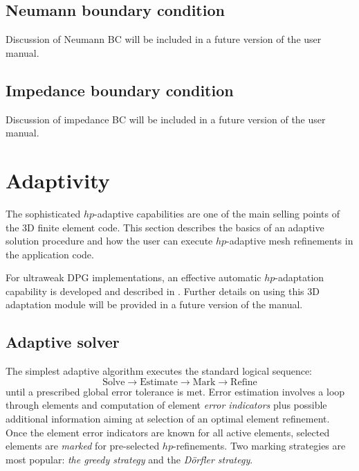 \subsection{Neumann boundary condition}
\label{sec:impedance}

Discussion of Neumann BC will be included in a future version of the user manual.

\subsection{Impedance boundary condition}
\label{sec:impedance}

Discussion of impedance BC will be included in a future version of the user manual.

\section{Adaptivity}
\label{sec:adaptivity}

The sophisticated $hp$-adaptive capabilities are one of the main selling points of the \hp3D finite element code. This section describes the basics of an adaptive solution procedure and how the user can execute $hp$-adaptive mesh refinements in the application code.

For ultraweak DPG implementations, an effective automatic $hp$-adaptation capability is developed and described in \cite{chakraborty2024hp}. Further details on using this \hp3D adaptation module will be provided in a future version of the manual.

\subsection{Adaptive solver}
\label{sec:adaptive-solver}

The simplest adaptive algorithm executes the standard logical sequence:
\[
	\text{Solve} \longrightarrow
	\text{Estimate} \longrightarrow
	\text{Mark} \longrightarrow
	\text{Refine} 
\]
until a prescribed global error tolerance is met. Error estimation involves a loop through elements and computation of element {\em error indicators} plus possible additional information aiming at selection of an optimal element refinement. Once the element error indicators are known for all active elements, selected elements are {\em marked} for pre-selected $hp$-refinements. Two marking strategies are most popular: {\em the greedy strategy} and the {\em D\"orfler strategy}. 

